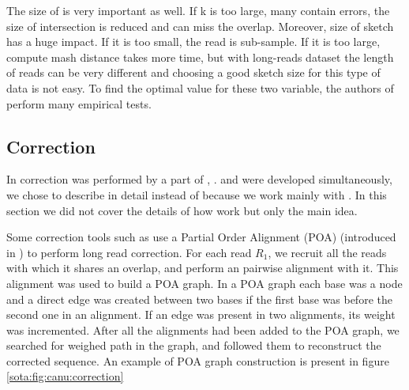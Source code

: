 \documentclass[main]{subfiles}
\begin{document}
The size of \kmer is very important as well. If k is too large, many \kmer contain errors, the size of intersection is reduced and \mhap can miss the overlap. Moreover, size of sketch has a huge impact. If it is too small, the read is sub-sample. If it is too large, compute mash distance takes more time, but with long-reads dataset the length of reads can be very different and choosing a good sketch size for this type of data is not easy. To find the optimal value for these two variable, the authors of \mhap perform many empirical tests.

\subsection{Correction}

In \canu correction was performed by a part of  \cite{falcon}, .  and \canu were developed simultaneously, we chose to describe \canu in detail instead of  because we work mainly with \canu. In this section we did not cover the details of how  work but only the main idea.

Some correction tools such as  use a Partial Order Alignment (POA) (introduced in \cite{poa}) to perform long read correction. For each read \texttt{$R_1$}, we recruit all the reads with which it shares an overlap, and perform an pairwise alignment with it. This alignment was used to build a POA graph. In a POA graph each base was a node and a direct edge was created between two bases if the first base was before the second one in an alignment. If an edge was present in two alignments, its weight was incremented. After all the alignments had been added to the POA graph, we searched for weighed path in the graph, and followed them to reconstruct the corrected sequence. An example of POA graph construction is present in figure \ref{sota:fig:canu:correction}
\end{document}
